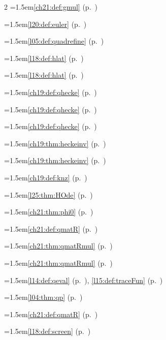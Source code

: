 \begin{multicols}{2}
\hangindent=1.5em\quad \ref{ch21:def:gmul} (p.~\pageref{ch21:def:gmul})\par
\hangindent=1.5em\quad \ref{l20:def:euler} (p.~\pageref{l20:def:euler})\par
\hangindent=1.5em\quad \ref{l05:def:quadrefine} (p.~\pageref{l05:def:quadrefine})\par
\hangindent=1.5em\quad \ref{l18:def:hlat} (p.~\pageref{l18:def:hlat})\par
\hangindent=1.5em\quad \ref{l18:def:hlat} (p.~\pageref{l18:def:hlat})\par
\hangindent=1.5em\quad \ref{ch19:def:qhecke} (p.~\pageref{ch19:def:qhecke})\par
\hangindent=1.5em\quad \ref{ch19:def:qhecke} (p.~\pageref{ch19:def:qhecke})\par
\hangindent=1.5em\quad \ref{ch19:def:qhecke} (p.~\pageref{ch19:def:qhecke})\par
\hangindent=1.5em\quad \ref{ch19:thm:heckeinv} (p.~\pageref{ch19:thm:heckeinv})\par
\hangindent=1.5em\quad \ref{ch19:thm:heckeinv} (p.~\pageref{ch19:thm:heckeinv})\par
\hangindent=1.5em\quad \ref{ch19:def:knz} (p.~\pageref{ch19:def:knz})\par
\hangindent=1.5em\quad \ref{l25:thm:HOde} (p.~\pageref{l25:thm:HOde})\par
\hangindent=1.5em\quad \ref{ch21:thm:phi0} (p.~\pageref{ch21:thm:phi0})\par
\hangindent=1.5em\quad \ref{ch21:def:qmatR} (p.~\pageref{ch21:def:qmatR})\par
\hangindent=1.5em\quad \ref{ch21:thm:qmatRmul} (p.~\pageref{ch21:thm:qmatRmul})\par
\hangindent=1.5em\quad \ref{ch21:thm:qmatRmul} (p.~\pageref{ch21:thm:qmatRmul})\par
\hangindent=1.5em\quad \ref{l14:def:qeval} (p.~\pageref{l14:def:qeval}), \ref{l15:def:traceFun} (p.~\pageref{l15:def:traceFun})\par
\hangindent=1.5em\quad \ref{l04:thm:qp} (p.~\pageref{l04:thm:qp})\par
\hangindent=1.5em\quad \ref{ch21:def:qmatR} (p.~\pageref{ch21:def:qmatR})\par
\hangindent=1.5em\quad \ref{l18:def:screen} (p.~\pageref{l18:def:screen})\par

\end{multicols}

